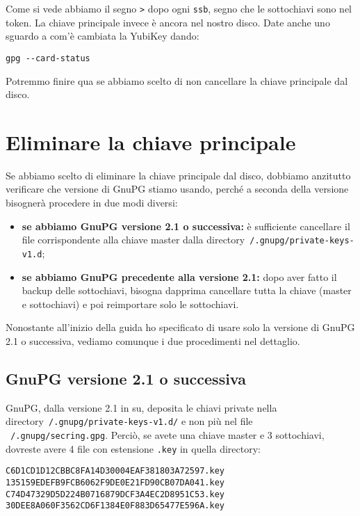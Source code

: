 \documentclass[a4paper,10pt]{article}
\begin{document}
Come si vede abbiamo il segno \texttt{>} dopo ogni \texttt{ssb}, segno che le sottochiavi sono nel token. La chiave principale invece è ancora nel nostro disco. Date anche uno sguardo a com'è cambiata la YubiKey dando:

\begin{lstlisting}
gpg --card-status
\end{lstlisting}

Potremmo finire qua se abbiamo scelto di non cancellare la chiave principale dal disco.

\section{Eliminare la chiave principale}

Se abbiamo scelto di eliminare la chiave principale dal disco, dobbiamo anzitutto verificare che versione di GnuPG stiamo usando, perché a seconda della versione bisognerà procedere in due modi diversi:

\begin{itemize}
   \item \textbf{se abbiamo GnuPG versione 2.1 o successiva:} è sufficiente cancellare il file corrispondente alla chiave master dalla directory\newline \texttt{~/.gnupg/private-keys-v1.d};
   \item \textbf{se abbiamo GnuPG precedente alla versione 2.1:} dopo aver fatto il backup delle sottochiavi, bisogna dapprima cancellare tutta la chiave (master e sottochiavi) e poi reimportare solo le sottochiavi.
\end{itemize}

Nonostante all'inizio della guida ho specificato di usare solo la versione di GnuPG 2.1 o successiva, vediamo comunque i due procedimenti nel dettaglio.

\subsection{GnuPG versione 2.1 o successiva}

GnuPG, dalla versione 2.1 in su, deposita le chiavi private nella directory\newline \texttt{~/.gnupg/private-keys-v1.d/} e non più nel file \texttt{~/.gnupg/secring.gpg}. Perciò, se avete una chiave master e 3 sottochiavi, dovreste avere 4 file con estensione \texttt{.key} in quella directory:

\begin{lstlisting}
C6D1CD1D12CBBC8FA14D30004EAF381803A72597.key
135159EDEFB9FCB6062F9DE0E21FD90CB07DA041.key
C74D47329D5D224B0716879DCF3A4EC2D8951C53.key
30DEE8A060F3562CD6F1384E0F883D65477E596A.key
\end{lstlisting}
\end{document}
